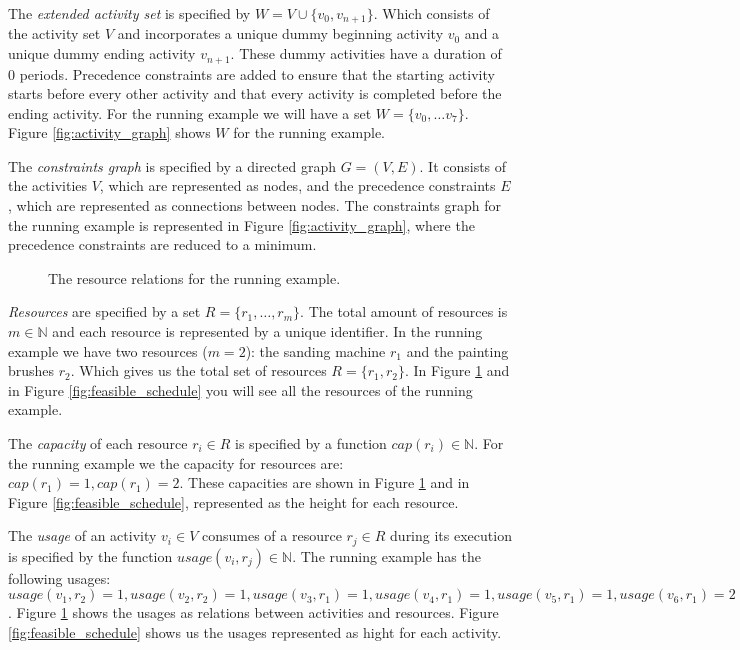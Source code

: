 \documentclass{article}
\theoremstyle{definition}
\newcommand{\res}[0]{\ensuremath{R}} %
\newcommand{\capa}[1]{\ensuremath{cap(r_{#1})}} %
\newcommand{\usage}[2]{\ensuremath{usage(v_{#1}, r_{#2})}} %
\begin{document}
The \emph{extended activity set} is specified by $W = V \cup \{v_0, v_{n+1}\}$.
Which consists of the activity set $V$ and incorporates a unique dummy beginning activity $v_0$ and a unique dummy ending activity $v_{n+1}$. 
These dummy activities have a duration of $0$ periods.
Precedence constraints are added to ensure that the starting activity starts before every other activity and that every activity is completed before the ending activity. 
For the running example we will have a set $W = \{v_0, \ldots v_7\}$.
Figure \ref{fig:activity_graph} shows $W$ for the running example. 

The \emph{constraints graph} is specified by a directed graph $G = (V, E)$.
It consists of the activities $V$, which are represented as nodes, and the precedence constraints $E$, which are represented as connections between nodes.
The constraints graph for the running example is represented in Figure \ref{fig:activity_graph}, where the precedence constraints are reduced to a minimum.

\begin{figure}[h]
	\centering
	
	\caption{The resource relations for the running example. }
	\label{fig:resource_graph}
\end{figure}

\emph{Resources} are specified by a set $R = \{r_1, \ldots, r_m\}$.
The total amount of resources is $m \in \mathbb{N}$ and each resource is represented by a unique identifier. %
In the running example we have two resources ($m = 2$): the sanding machine $r_1$ and the painting brushes $r_2$.
Which gives us the total set of resources $R = \{r_1, r_2\}$.
In Figure \ref{fig:resource_graph} and in Figure \ref{fig:feasible_schedule} you will see all the resources of the running example.

The \emph{capacity} of each resource $r_i \in R$ is specified by a function $\capa{i} \in \mathbb{N}$.
For the running example we the capacity for resources are: $\capa{1} = 1, \capa{1} = 2$.
These capacities are shown in Figure \ref{fig:resource_graph} and in Figure \ref{fig:feasible_schedule}, represented as the height for each resource.

The \emph{usage} of an activity $v_i \in V$ consumes of a resource $r_j \in \res$ during its execution is specified by the function $\usage{i}{j} \in \mathbb{N}$.
The running example has the following usages: $\usage{1}{2} = 1, \usage{2}{2} = 1, \usage{3}{1} = 1, \usage{4}{1} = 1, \usage{5}{1} = 1, \usage{6}{1} = 2$.
Figure \ref{fig:resource_graph} shows the usages as relations between activities and resources.
Figure \ref{fig:feasible_schedule} shows us the usages represented as hight for each activity.
\end{document}
